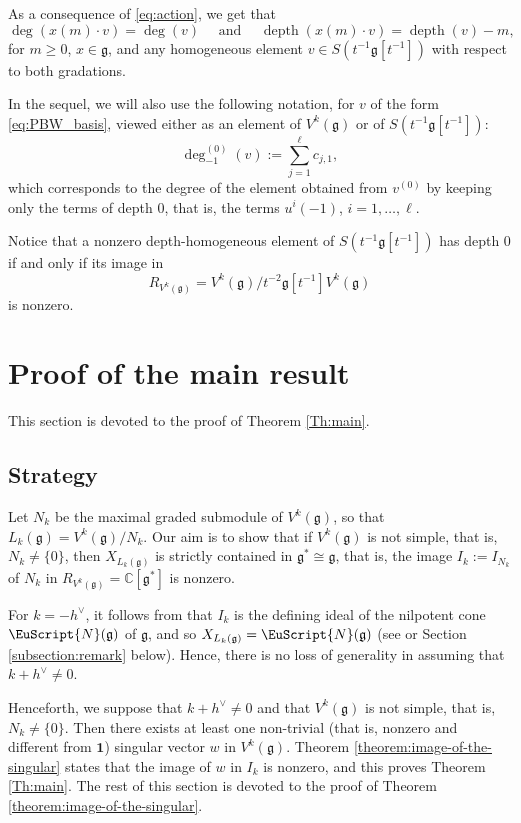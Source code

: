 \documentclass[JEP,XML,SOM,Unicode]{cedram}
\let\oldvee\vee
\renewcommand{\vee}{{\scriptscriptstyle\oldvee}}
\let\mathcal \EuScript
\newcommand\C{{\mathbb C}}
\DeclareMathOperator{\dep}{depth}
\newcommand \g{\mathfrak g}
\theoremstyle{definition}
\begin{document}
As a consequence of \eqref{eq:action}, we get that
\begin{equation}
\label{eq:homogeneous}
\deg(x(m)\cdot v) = \deg(v) \quad \text{ and }
\quad \dep(x(m)\cdot v)= \dep(v) - m,
\end{equation}
for
$m\geq 0$, $x\in\g$, and any homogeneous element $v \in S(t^{-1}\g[t^{-1}])$
with respect to both gradations.

In the sequel, we will also
use the following notation, for $v$ of the form \eqref{eq:PBW_basis},
viewed either as an element of $V^k(\g)$ or of $S(t^{-1}\g[t^{-1}])$:
\begin{equation}
\label{eq:deg_-1}
\deg_{-1}^{(0)}(v) :=
\sum_{j=1}^\ell c_{j,1 },
\end{equation}
which corresponds to the degree of the element
obtained from $v^{(0)}$ by keeping only the terms of
depth $0$, that is, the terms $u^{i}(-1)$, $i=1,\dots,\ell$.

Notice that a nonzero depth-homogeneous
element of $S(t^{-1}\g[t^{-1}])$ has depth $0$ if
and only if
its image in
\[
R_{V^k(\g)} = V^k(\g)/t^{-2} \g[t^{-1}] V^k(\g)
\]
is nonzero.
\section{Proof of the main result}
\label{sec:main_proof}

This section is devoted to the proof of Theorem \ref{Th:main}.

\subsection{Strategy}
{Let $N_k$ be the maximal graded submodule of $V^k(\g)$,
so that $L_k(\g)=V^k(\g)/N_k$.
Our aim is to show that if $V^k(\g)$ is not simple, that is,
$N_k\not=\{0\}$, then $X_{L_k(\g)}$
is strictly contained in $\g^*\cong\g$, that is,
the image $I_k:=I_{N_k}$ of $N_k$ in
$R_{V^k(\g)}=\C[\g^*]$ is nonzero.}

For $k=-h^\vee$, it follows from \cite{FreGai04} that
$I_k$ is the defining ideal of the
nilpotent
cone $ \mathcal{N}(\g)$ of $\g$,
and so
$X_{L_k(\g)} = \mathcal{N}(\g)$ (see \cite{A11} or Section \ref{subsection:remark}
below).
Hence, there is no loss of generality in assuming that $k+h^\vee \not=0$.

Henceforth, we suppose that $k+h^\vee \not=0$ and
that $V^k(\g)$ is not simple,
that is,
$N_k\ne \{0\}$.
Then there exists at least
one non-trivial (that is, nonzero and different from
$\mathbf{1}$) singular vector $w$
in $V^k(\g)$.
Theorem \ref{theorem:image-of-the-singular}
states that
the image of $w$ in $I_k$ is nonzero,
and
this proves
Theorem \ref{Th:main}. The rest of this section is devoted
to the proof of Theorem \ref{theorem:image-of-the-singular}.
\end{document}
